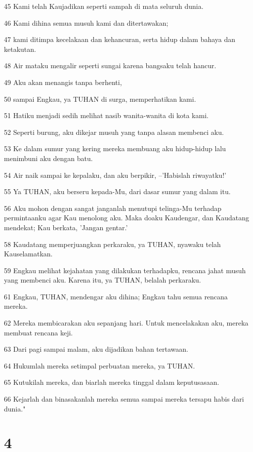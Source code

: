 \par 45 Kami telah Kaujadikan seperti sampah di mata seluruh dunia.
\par 46 Kami dihina semua musuh kami dan ditertawakan;
\par 47 kami ditimpa kecelakaan dan kehancuran, serta hidup dalam bahaya dan ketakutan.
\par 48 Air mataku mengalir seperti sungai karena bangsaku telah hancur.
\par 49 Aku akan menangis tanpa berhenti,
\par 50 sampai Engkau, ya TUHAN di surga, memperhatikan kami.
\par 51 Hatiku menjadi sedih melihat nasib wanita-wanita di kota kami.
\par 52 Seperti burung, aku dikejar musuh yang tanpa alasan membenci aku.
\par 53 Ke dalam sumur yang kering mereka membuang aku hidup-hidup lalu menimbuni aku dengan batu.
\par 54 Air naik sampai ke kepalaku, dan aku berpikir, --'Habislah riwayatku!'
\par 55 Ya TUHAN, aku berseru kepada-Mu, dari dasar sumur yang dalam itu.
\par 56 Aku mohon dengan sangat janganlah menutupi telinga-Mu terhadap permintaanku agar Kau menolong aku. Maka doaku Kaudengar, dan Kaudatang mendekat; Kau berkata, 'Jangan gentar.'
\par 58 Kaudatang memperjuangkan perkaraku, ya TUHAN, nyawaku telah Kauselamatkan.
\par 59 Engkau melihat kejahatan yang dilakukan terhadapku, rencana jahat musuh yang membenci aku. Karena itu, ya TUHAN, belalah perkaraku.
\par 61 Engkau, TUHAN, mendengar aku dihina; Engkau tahu semua rencana mereka.
\par 62 Mereka membicarakan aku sepanjang hari. Untuk mencelakakan aku, mereka membuat rencana keji.
\par 63 Dari pagi sampai malam, aku dijadikan bahan tertawaan.
\par 64 Hukumlah mereka setimpal perbuatan mereka, ya TUHAN.
\par 65 Kutukilah mereka, dan biarlah mereka tinggal dalam keputusasaan.
\par 66 Kejarlah dan binasakanlah mereka semua sampai mereka tersapu habis dari dunia."

\chapter{4}


